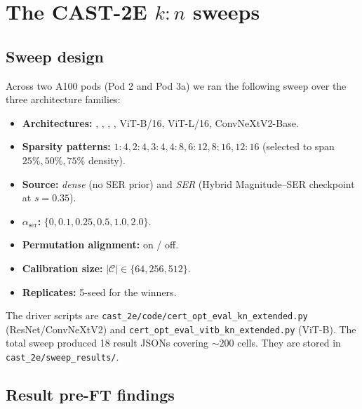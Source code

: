 \documentclass[11pt]{article}
\theoremstyle{plain}
\theoremstyle{definition}
\theoremstyle{remark}
\newcommand{\1}{\mathbf{1}}
\begin{document}
\section{The CAST-2E \texorpdfstring{$k{:}n$}{k:n} sweeps}
\label{sec:kn-sweeps}

\subsection{Sweep design}

Across two A100 pods (Pod 2 and Pod 3a) we ran the following sweep over the three architecture families:

\begin{itemize}[leftmargin=2em]
\item \textbf{Architectures:} , , , , ViT-B/16, ViT-L/16, ConvNeXtV2-Base.
\item \textbf{Sparsity patterns:} $1{:}4, 2{:}4, 3{:}4, 4{:}8, 6{:}12, 8{:}16, 12{:}16$ (selected to span $25\%, 50\%, 75\%$ density).
\item \textbf{Source:} \emph{dense} (no SER prior) and \emph{SER} (Hybrid Magnitude--SER checkpoint at $s=0.35$).
\item \textbf{$\alpha_{\mathrm{ser}}$:} $\{0, 0.1, 0.25, 0.5, 1.0, 2.0\}$.
\item \textbf{Permutation alignment:} on / off.
\item \textbf{Calibration size:} $|\mathcal{C}| \in \{64, 256, 512\}$.
\item \textbf{Replicates:} 5-seed for the winners.
\end{itemize}

The driver scripts are \texttt{cast\_2e/code/cert\_opt\_eval\_kn\_extended.py} (ResNet/ConvNeXtV2) and \texttt{cert\_opt\_eval\_vitb\_kn\_extended.py} (ViT-B). The total sweep produced 18 result JSONs covering $\sim\!200$ cells. They are stored in \texttt{cast\_2e/sweep\_results/}.

\subsection{Result pre-FT findings}
\end{document}
